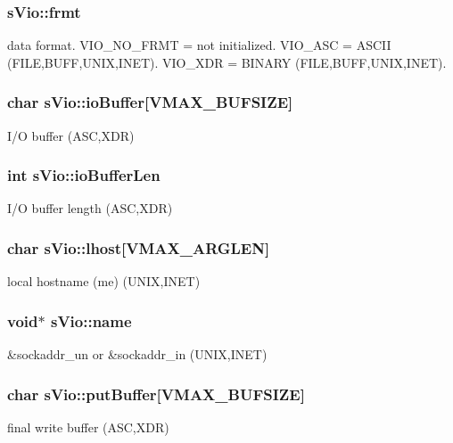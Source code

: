 \subsubsection[{frmt}]{ {\bf sVio::frmt}}\label{a00002_a6c29ebe4584937b74a3c0b449310f1ac}
data format. VIO\_\-NO\_\-FRMT = not initialized. VIO\_\-ASC = ASCII (FILE,BUFF,UNIX,INET). VIO\_\-XDR = BINARY (FILE,BUFF,UNIX,INET). 
\subsubsection[{ioBuffer}]{\setlength{\rightskip}{0pt plus 5cm}char {\bf sVio::ioBuffer}[VMAX\_\-BUFSIZE]}\label{a00002_aa782f06576338c4bf32af13ffa76b455}
I/O buffer (ASC,XDR) 
\subsubsection[{ioBufferLen}]{\setlength{\rightskip}{0pt plus 5cm}int {\bf sVio::ioBufferLen}}\label{a00002_a319b82ac4590beb7b7971822fc5ab471}
I/O buffer length (ASC,XDR) 
\subsubsection[{lhost}]{\setlength{\rightskip}{0pt plus 5cm}char {\bf sVio::lhost}[VMAX\_\-ARGLEN]}\label{a00002_a8bb72a4f63380102527e19b592f70acc}
local hostname (me) (UNIX,INET) 
\subsubsection[{name}]{\setlength{\rightskip}{0pt plus 5cm}void$\ast$ {\bf sVio::name}}\label{a00002_ab949cc025dba7a425e9a483d7b9452be}
\&sockaddr\_\-un or \&sockaddr\_\-in (UNIX,INET) 
\subsubsection[{putBuffer}]{\setlength{\rightskip}{0pt plus 5cm}char {\bf sVio::putBuffer}[VMAX\_\-BUFSIZE]}\label{a00002_a026eee4ab9d1413ac7dec57bcba4cff9}
final write buffer (ASC,XDR) 
